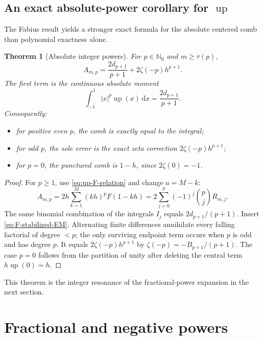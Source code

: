 \documentclass[11pt]{article}
\newtheorem{theorem}{Theorem}[section]
\theoremstyle{definition}
\newcommand{\Up}{\operatorname{up}}
\newcommand{\dd}{\,\mathrm{d}}
\newcommand{\N}{\mathbb{N}}
\begin{document}
\subsection{An exact absolute-power corollary for \texorpdfstring{$\Up$}{up}}

The Fabius result yields a stronger exact formula for the absolute centered
comb than polynomial exactness alone.

\begin{theorem}[Absolute integer powers]
\label{thm:absolute-integer}
For $p\in\N_0$ and $m\ge\tau(p)$,
\begin{equation}
 \boxed{
 A_{m,p}
 =\frac{2d_{p+1}}{p+1}
 +2\zeta(-p)h^{p+1}.}
 \label{eq:absolute-integer-closed}
\end{equation}
The first term is the continuous absolute moment
\begin{equation}
 \int_{-1}^{1}|x|^p\Up(x)\dd x
 =\frac{2d_{p+1}}{p+1}.
 \label{eq:absolute-continuous}
\end{equation}
Consequently:
\begin{itemize}[leftmargin=2em]
\item for positive even $p$, the comb is exactly equal to the integral;
\item for odd $p$, the sole error is the exact zeta correction
$2\zeta(-p)h^{p+1}$;
\item for $p=0$, the punctured comb is $1-h$, since $2\zeta(0)=-1$.
\end{itemize}
\end{theorem}

\begin{proof}
For $p\ge1$, use \eqref{eq:up-F-relation} and change $a=M-k$:
\[
 A_{m,p}=2h\sum_{k=1}^{M}(kh)^pF(1-kh)
 =2\sum_{j=0}^{p}(-1)^j\binom pj R_{m,j}.
\]
The same binomial combination of the integrals $I_j$ equals
$2d_{p+1}/(p+1)$.  Insert \eqref{eq:F-stabilized-EM}.  Alternating finite
differences annihilate every falling factorial of degree $<p$; the only
surviving endpoint term occurs when $p$ is odd and has degree $p$.  It equals
$2\zeta(-p)h^{p+1}$ by $\zeta(-p)=-B_{p+1}/(p+1)$.  The case $p=0$ follows
from the partition of unity after deleting the central term $h\Up(0)=h$.
\end{proof}

This theorem is the integer resonance of the fractional-power expansion in
the next section.

\section{Fractional and negative powers}
\label{sec:fractional}
\end{document}
